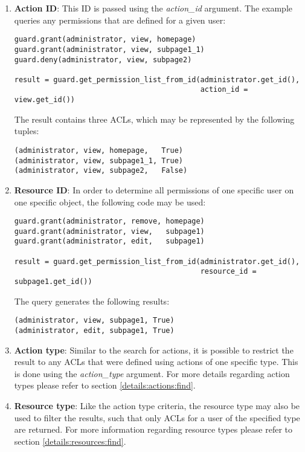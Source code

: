 \begin{enumerate}
\item {\bf Action ID}: This ID is passed using the {\it action\_id} argument. 
The example queries any permissions that are defined for a given user:

\begin{lstlisting}
guard.grant(administrator, view, homepage)
guard.grant(administrator, view, subpage1_1)
guard.deny(administrator, view, subpage2)

result = guard.get_permission_list_from_id(administrator.get_id(),
                                           action_id = view.get_id())
\end{lstlisting}

The result contains three ACLs, which may be represented by the following 
tuples:

\begin{lstlisting}
(administrator, view, homepage,   True)
(administrator, view, subpage1_1, True)
(administrator, view, subpage2,   False)
\end{lstlisting}

\item {\bf Resource ID}: In order to determine all permissions of one 
specific user on one specific object, the following code may be used:

\begin{lstlisting}
guard.grant(administrator, remove, homepage)
guard.grant(administrator, view,   subpage1)
guard.grant(administrator, edit,   subpage1)

result = guard.get_permission_list_from_id(administrator.get_id(),
                                           resource_id = subpage1.get_id())
\end{lstlisting}

The query generates the following results:

\begin{lstlisting}
(administrator, view, subpage1, True)
(administrator, edit, subpage1, True)
\end{lstlisting}

\item {\bf Action type}: Similar to the search for actions, it is possible 
to restrict the result to any ACLs that were defined using actions of one 
specific type. This is done using the {\it action\_type} argument. For more 
details regarding action types please refer to section 
\ref{details:actions:find}.

\item {\bf Resource type}: Like the action type criteria, the resource type 
may also be used to filter the results, such that only ACLs for a user of 
the specified type are returned. For more information regarding resource 
types please refer to section \ref{details:resources:find}.
\end{enumerate}

